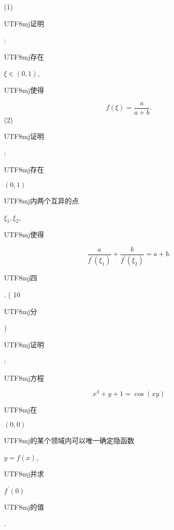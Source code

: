 \documentclass[10pt]{article}
\begin{document}
(1) \begin{CJK}{UTF8}{mj}证明\end{CJK}: \begin{CJK}{UTF8}{mj}存在\end{CJK} $\xi \in(0,1)$, \begin{CJK}{UTF8}{mj}使得\end{CJK}
$$
f(\xi)=\frac{a}{a+b} .
$$
(2) \begin{CJK}{UTF8}{mj}证明\end{CJK}: \begin{CJK}{UTF8}{mj}存在\end{CJK} $(0,1)$ \begin{CJK}{UTF8}{mj}内两个互异的点\end{CJK} $\xi_{1}, \xi_{2}$, \begin{CJK}{UTF8}{mj}使得\end{CJK}
$$
\frac{a}{f^{\prime}\left(\xi_{1}\right)}+\frac{b}{f^{\prime}\left(\xi_{2}\right)}=a+b .
$$
\begin{CJK}{UTF8}{mj}四\end{CJK}. ( 10 \begin{CJK}{UTF8}{mj}分\end{CJK}) \begin{CJK}{UTF8}{mj}证明\end{CJK}: \begin{CJK}{UTF8}{mj}方程\end{CJK}
$$
x^{3}+y+1=\cos (x y)
$$
\begin{CJK}{UTF8}{mj}在\end{CJK} $(0,0)$ \begin{CJK}{UTF8}{mj}的某个领域内可以唯一确定隐函数\end{CJK} $y=f(x)$, \begin{CJK}{UTF8}{mj}并求\end{CJK} $f^{\prime}(0)$ \begin{CJK}{UTF8}{mj}的值\end{CJK}.
\end{document}
